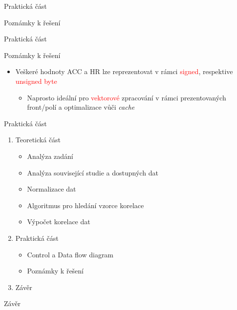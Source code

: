 \documentclass[aspectratio=169, xcolor=dvipsnames]{beamer}
\begin{document}
\begin{frame}{Praktická část}
 \begin{center}
  Poznámky k řešení
 \end{center} 
\end{frame}

\begin{frame}{Praktická část}
  \begin{block}{Poznámky k řešení}
    \begin{itemize}
        \pause
      \item Veškeré hodnoty ACC a HR lze reprezentovat v rámci \textcolor{Red}{signed}, respektive \textcolor{Red}{unsigned byte}
        \pause
        \begin{itemize}
          \item Naprosto ideální pro \textcolor{Red}{vektorové} zpracování v rámci prezentovaných front/polí a optimalizace vůči \textit{cache}
        \end{itemize}
    \end{itemize} 
  \end{block}
\end{frame}

\begin{frame}{Praktická část}
	\begin{enumerate}
    \item Teoretická část
      \begin{itemize}
        \item Analýza zadání 
        \item Analýza související studie a dostupných dat 
        \item Normalizace dat
        \item Algoritmus pro hledání vzorce korelace
        \item Výpočet korelace dat
      \end{itemize}

    \item Praktická část
      \begin{itemize}
        \item Control a Data flow diagram
        \item Poznámky k řešení
      \end{itemize}
    \item Závěr
  \end{enumerate}
\end{frame}

\begin{frame}
  \begin{center}
    Závěr 
  \end{center}
\end{frame}
\end{document}
